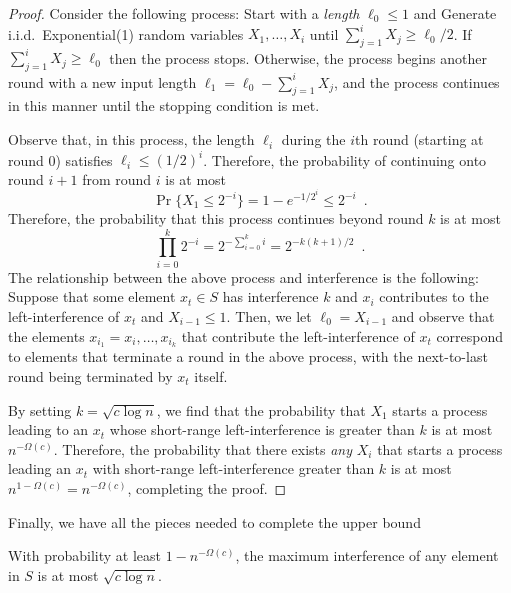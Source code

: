 \documentclass{patmorin}
\begin{document}
\begin{proof}
Consider the following process: Start with a \emph{length} $\ell_0 \le 1$
and Generate i.i.d.\ Exponential(1) random variables $X_1,\ldots,X_i$
until $\sum_{j=1}^i {X_j} \ge \ell_0/2$. If $\sum_{j=1}^i {X_j} \ge
\ell_0$ then the process stops.  Otherwise, the process begins another
round with a new input length $\ell_1=\ell_0-\sum_{j=1}^i {X_j}$, and
the process continues in this manner until the stopping condition is met.

Observe that, in this process, the length $\ell_i$ during the $i$th
round (starting at round 0) satisfies $\ell_i\le (1/2)^i$.  Therefore,
the probability of continuing onto round $i+1$ from round $i$ is at most
\[
   \Pr\{X_1 \le 2^{-i}\} = 1-e^{-1/2^i} \le 2^{-i} \enspace .
\]
Therefore, the probability that this process continues beyond round $k$
is at most
\[
    \prod_{i=0}^{k} 2^{-i} = 2^{-\sum_{i=0}^{k} i} = 2^{-k(k+1)/2}
\enspace .
\]
The relationship between the above process and interference is the
following:  Suppose that some element $x_t\in S$ has interference $k$
and $x_i$ contributes to the left-interference of $x_t$ and $X_{i-1}\le
1$.  Then, we let $\ell_0=X_{i-1}$ and observe that the elements
$x_{i_1}=x_i,\ldots,x_{i_k}$ that contribute the left-interference of
$x_t$ correspond to elements that terminate a round in the above process,
with the next-to-last round being terminated by $x_t$ itself.

By setting $k=\sqrt{c\log n}$, we find that the probability that $X_{1}$
starts a process leading to an $x_t$ whose short-range left-interference is
greater than $k$ is at most $n^{-\Omega(c)}$.  Therefore, the probability that
there exists \emph{any} $X_i$ that starts a process leading an $x_t$ with
short-range left-interference greater than $k$ is at most
$n^{1-\Omega(c)}=n^{-\Omega(c)}$, completing the proof.
\end{proof}


Finally, we have all the pieces needed to complete the upper bound

\begin{lem}
With probability at least $1-n^{-\Omega(c)}$, the maximum interference of
any element in $S$ is at most $\sqrt{c\log n}$.
\end{lem}
\end{document}

